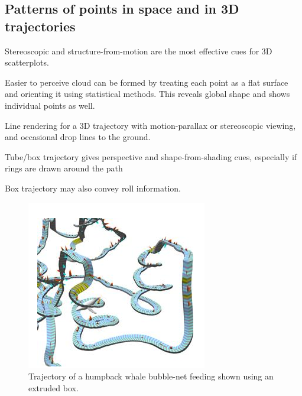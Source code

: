 \begin{mdframed}
\subsection{Patterns of points in space and in 3D trajectories}
\begin{multicols}{2}
\begin{compactdesc}
\item[Stereoscopic and structure-from-motion] are the most effective cues for
    3D scatterplots.
\item[Easier to perceive cloud] can be formed by treating each point as a flat
    surface and orienting it using statistical methods. This reveals global
    shape and shows individual points as well.

\item[Line rendering for a 3D trajectory] with motion-parallax or stereoscopic viewing, and
    occasional drop lines to the ground.
\item[Tube/box trajectory] gives perspective and shape-from-shading cues,
    especially if rings are drawn around the path
\item[Box trajectory] may also convey roll information.
\end{compactdesc}
    \begin{figure}[H]
        \centering
        \includegraphics[width=0.5\linewidth]{whale_trajectory.png}
        \caption{Trajectory of a humpback whale bubble-net feeding shown using
        an extruded box.}
    \end{figure}

\end{multicols}\end{mdframed}



